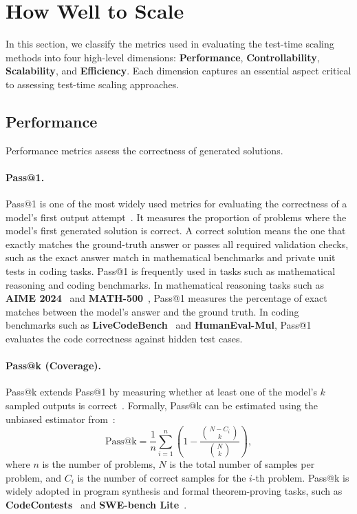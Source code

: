 \section{How Well to Scale}
\label{sec:howwell2scale}

In this section, we classify the metrics used in evaluating the test-time scaling methods into four high-level dimensions: 
\textbf{Performance}, \textbf{Controllability}, \textbf{Scalability}, and \textbf{Efficiency}.
Each dimension captures an essential aspect critical to assessing test-time scaling approaches.

\subsection{Performance}
\label{subsec:performance}
Performance metrics assess the correctness of generated solutions.

\paragraph{Pass@1.} 
Pass@1 is one of the most widely used metrics for evaluating the correctness of a model’s first output attempt~\citep{deepseek-r1, li2025stesttimescaling, snell2024scaling, xie2025logic, kimi-k1.5, yang2025towards, yang2025reasonflux, hou2025advancing}. 
It measures the proportion of problems where the model’s first generated solution is correct. 
A correct solution means the one that exactly matches the ground-truth answer or passes all required validation checks, such as the exact answer match in mathematical benchmarks and private unit tests in coding tasks. 
Pass@1 is frequently used in tasks such as mathematical reasoning and coding benchmarks. 
In mathematical reasoning tasks such as \textbf{AIME 2024}~\citep{aime25} and \textbf{MATH-500}~\citep{zhang2024rest}, Pass@1 measures the percentage of exact matches between the model's answer and the ground truth.
In coding benchmarks such as \textbf{LiveCodeBench}~\citep{jain2025livecodebench} and \textbf{HumanEval-Mul}, Pass@1 evaluates the code correctness against hidden test cases. 

\paragraph{Pass@k (Coverage).} 
Pass@k extends Pass@1 by measuring whether at least one of the model’s $k$ sampled outputs is correct~\citep{brown2024large, snell2024scaling, li2025stesttimescaling}. Formally, Pass@k can be estimated using the unbiased estimator from~\citet{chen2021evaluating}:
\[
\text{Pass@k} = \frac{1}{n} \sum_{i=1}^{n} \left(1 - \frac{\binom{N - C_i}{k}}{\binom{N}{k}}\right),
\]
where $n$ is the number of problems, $N$ is the total number of samples per problem, and $C_i$ is the number of correct samples for the $i$-th problem. 
Pass@k is widely adopted in program synthesis and formal theorem-proving tasks, such as \textbf{CodeContests}~\citep{Li2022competition} and \textbf{SWE-bench Lite}~\citep{jimenez2024swebench}.

